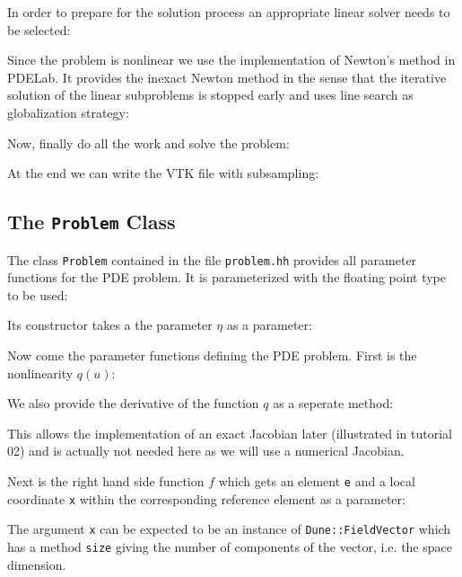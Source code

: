\documentclass[a4paper,12pt]{article}
\begin{document}
In order to prepare for the solution process an appropriate 
linear solver needs to be selected:


Since the problem is nonlinear we use the implementation of
Newton's method in PDELab. It provides the inexact Newton method
in the sense that the iterative solution of the linear subproblems is
stopped early and uses line search as globalization strategy:


Now, finally do all the work and solve the problem:


At the end we can write the VTK file with subsampling:


\subsection{The \lstinline{Problem} Class}

The class \lstinline{Problem} contained in the file \lstinline{problem.hh}
provides all parameter functions for the PDE problem. It is parameterized
with the floating point type to be used:

Its constructor takes a the parameter $\eta$ as a parameter:

Now come the parameter functions defining the PDE problem.
First is the nonlinearity $q(u)$:

We also provide the derivative of the function $q$ as a seperate method:

This allows the implementation of an exact Jacobian later (illustrated
in tutorial 02) and is actually not needed here as we will use a
numerical Jacobian.

Next is the right hand side function $f$ which gets 
an element \lstinline{e} and a local coordinate \lstinline{x} within
the corresponding reference element as a parameter:

The argument \lstinline{x} can be expected to be an instance
of \lstinline{Dune::FieldVector} which has a method \lstinline{size}
giving the number of components of the vector, i.e. the space dimension.
\end{document}
